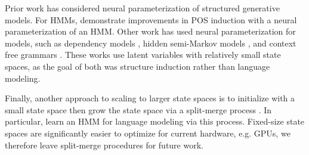 \documentclass[11pt,a4paper]{article}
\begin{document}
Prior work has considered neural parameterization of structured generative models. 
For HMMs, \citet{tran2016hmm} demonstrate improvements in POS induction with a
neural parameterization of an HMM. Other work has used neural parameterization for models, such as 
dependency models \citep{han2017dependency},
hidden semi-Markov models \citep{wiseman2018hsmm},
and context free grammars \citep{kim2019cpcfg}.
These works use latent variables with relatively small state spaces,
as the goal of both was structure induction rather than language modeling.

Finally, another approach to scaling to larger state spaces is to initialize
with a small state space then grow the state space via a split-merge process
\citep{petrov2006splitmerge,huang2011thesis}.
In particular, \citet{huang2011thesis} learn an HMM for language modeling
via this process.
Fixed-size state spaces are significantly easier to optimize for 
current hardware, e.g. GPUs, we therefore leave split-merge
procedures for future work. 

\end{document}
